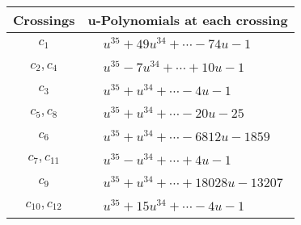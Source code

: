 \documentclass[1p]{elsarticle_modified}
\theoremstyle{definition}
\begin{document}
\begin{tabular}{m{50pt}|m{274pt}}
Crossings & \hspace{64pt}u-Polynomials at each crossing \\
\hline $$\begin{aligned}c_{1}\end{aligned}$$&$\begin{aligned}
&u^{35}+49 u^{34}+\cdots-74 u-1
\end{aligned}$\\
\hline $$\begin{aligned}c_{2},c_{4}\end{aligned}$$&$\begin{aligned}
&u^{35}-7 u^{34}+\cdots+10 u-1
\end{aligned}$\\
\hline $$\begin{aligned}c_{3}\end{aligned}$$&$\begin{aligned}
&u^{35}+u^{34}+\cdots-4 u-1
\end{aligned}$\\
\hline $$\begin{aligned}c_{5},c_{8}\end{aligned}$$&$\begin{aligned}
&u^{35}+u^{34}+\cdots-20 u-25
\end{aligned}$\\
\hline $$\begin{aligned}c_{6}\end{aligned}$$&$\begin{aligned}
&u^{35}+u^{34}+\cdots-6812 u-1859
\end{aligned}$\\
\hline $$\begin{aligned}c_{7},c_{11}\end{aligned}$$&$\begin{aligned}
&u^{35}- u^{34}+\cdots+4 u-1
\end{aligned}$\\
\hline $$\begin{aligned}c_{9}\end{aligned}$$&$\begin{aligned}
&u^{35}+u^{34}+\cdots+18028 u-13207
\end{aligned}$\\
\hline $$\begin{aligned}c_{10},c_{12}\end{aligned}$$&$\begin{aligned}
&u^{35}+15 u^{34}+\cdots-4 u-1
\end{aligned}$\\
\hline
\end{tabular}\\~\\
\end{document}

